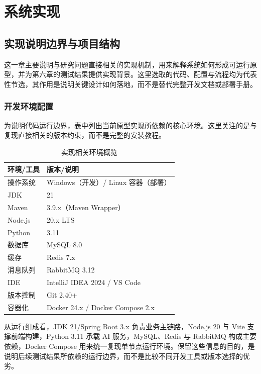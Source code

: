 ﻿%
\chapter{系统实现}

\section{实现说明边界与项目结构}

这一章主要说明与研究问题直接相关的实现机制，用来解释系统如何形成可运行原型，并为第六章的测试结果提供实现背景。这里选取的代码、配置与流程均为代表性节选，其作用是说明关键设计如何落地，而不是替代完整开发文档或部署手册。

\subsection{开发环境配置}

为说明代码运行边界，表中列出当前原型实现所依赖的核心环境。这里关注的是与复现直接相关的版本约束，而不是完整的安装教程。

\begin{table}[H]
\centering
\caption{实现相关环境概览}
\begin{tabular}{ll}
\toprule
环境/工具 & 版本/说明 \\
\midrule
操作系统 & Windows（开发）/ Linux 容器（部署） \\
JDK & 21 \\
Maven & 3.9.x（Maven Wrapper） \\
Node.js & 20.x LTS \\
Python & 3.11 \\
数据库 & MySQL 8.0 \\
缓存 & Redis 7.x \\
消息队列 & RabbitMQ 3.12 \\
IDE & IntelliJ IDEA 2024 / VS Code \\
版本控制 & Git 2.40+ \\
容器化 & Docker 24.x / Docker Compose 2.x \\
\bottomrule
\end{tabular}
\end{table}

从运行组成看，JDK 21/Spring Boot 3.x 负责业务主链路，Node.js 20 与 Vite 支撑前端构建，Python 3.11 承载 AI 服务，MySQL、Redis 与 RabbitMQ 构成主要依赖，Docker Compose 用来统一复现单节点运行环境。保留这些信息的目的，是说明后续测试结果所依赖的运行边界，而不是比较不同开发工具或版本选择的优劣。

